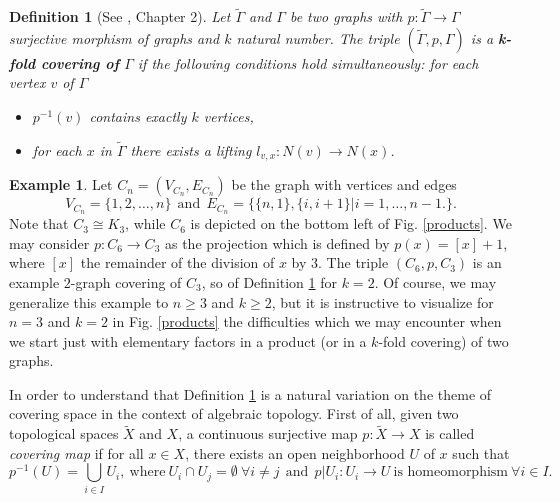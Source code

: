 \documentclass{amsart}
\newtheorem{defn}[theo]{Definition}
\theoremstyle{definition}
\newtheorem{example}[theo]{Example}
\numberwithin{equation}{section}
\begin{document}
\begin{defn}[See \cite{gross2}, Chapter 2]\label{kfold}
Let $\widetilde{\Gamma}$ and $\Gamma$ be two graphs with $p: \widetilde{\Gamma} \longrightarrow \Gamma$   surjective morphism of graphs and  $k$  natural number. The triple $(\widetilde{\Gamma}, p, \Gamma)$ is a \textbf{k-fold covering of } $\Gamma$ if the following conditions hold simultaneously: for each vertex $v$ of $\Gamma$
\begin{itemize}
    \item[{\rm (1).}]  $p^{-1}(v)$ contains exactly $k$ vertices,
    \item[{\rm (2).}] for each $x$ in $\widetilde{\Gamma}$ there exists a lifting  $l_{v,x}:N(v) \longrightarrow N(x)$.
\end{itemize}
\end{defn}
\begin{example}\label{exem.cover}
Let $C_n = (V_{C_n}, E_{C_n})$ be the graph with vertices and edges \begin{equation} V_{C_n} = \{1,2, \dots, n\} \  \ \mbox{and} \ \ E_{C_n} = \{\{n,1\}, \{i, i+1\} \vert i=1, \dots, n-1.\}.\end{equation} Note that $C_3 \cong K_3$, while  $C_6$ is depicted on the bottom left of Fig. \ref{products}. We may consider $p: C_6 \longrightarrow C_3$ as the projection which is defined by $p(x) = [x]+1$, where $[x]$ the remainder of the division of $x$ by $3$. The triple $(C_6, p, C_3)$ is an example $2$-graph covering of $C_3$, so of Definition \ref{kfold} for $k=2$. Of course, we may generalize this example to $n \ge 3$ and $k \ge 2$, but it is instructive to  visualize for $n=3$ and $k=2$ in Fig. \ref{products}  the difficulties which we may encounter when we start just with  elementary factors in a product (or in a $k$-fold covering) of two graphs.
\end{example}
In order to understand that Definition \ref{kfold} is a natural variation on the theme of covering space in the context of algebraic topology. First of all, given two topological spaces $\widetilde{X}$ and $X$, a continuous surjective map  $p \colon  \widetilde{X} \to X$ is called  \textit{covering map} if for all $x \in X$, there exists an open neighborhood $U$ of $x$ such that  
\begin{equation}\label{usualcovering1} p^{-1}(U) =\bigcup_{i \in I} U_i, \ \mbox{where} \ U_i \cap U_j =\emptyset \ \forall i \neq j \ \ \mbox{and} \ \ p|U_i : U_i \to  U \ \mbox{is homeomorphism} \ \forall i \in I. \end{equation}
\end{document}
